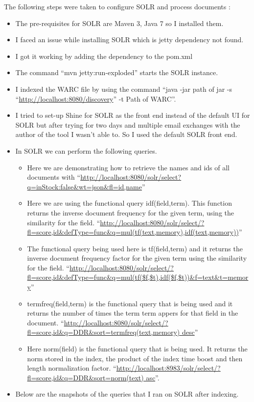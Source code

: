 The following steps were taken to configure SOLR and process documents :
\begin{itemize}
	\item The pre-requisites for SOLR are Maven 3, Java 7 so I installed them.
	\item I faced an issue while installing SOLR which is jetty dependency not found.
	\item I got it working by adding the dependency to the pom.xml
	\item The command ``mvn jetty:run-exploded'' starts the SOLR instance.
	\item I indexed the WARC file by using the command ``java -jar path of jar -s ``\url{http://localhost:8080/discovery}'' -t Path of WARC''.
	\item I tried to set-up Shine for SOLR as the front end instead of the default UI for SOLR but after trying for two days and multiple email exchanges with the author of the tool I wasn't able to. So I used the default SOLR front end.
	\item In SOLR we can perform the following queries.
	\begin{itemize}
	\item Here we are demonstrating how to retrieve the names and ids of all documents with ``\url{http://localhost:8080/solr/select?q=inStock:false&wt=json&fl=id,name}''
	\item Here we are using the functional query idf(field,term). This function returns the inverse document frequency for the given term, using the similarity for the field. ``\url{http://localhost:8080/solr/select/?fl=score,id&defType=func&q=mul(tf(text,memory),idf(text,memory))}''
	
	\item The functional query being used here is tf(field,term) and it returns the inverse document frequency factor for the given term using the similarity for the field. ``\url{http://localhost:8080/solr/select/?fl=score,id&defType=func&q=mul(tf($f,$t),idf($f,$t))&f=text&t=memory}''
	
	\item termfreq(field,term) is the functional query that is being used and it returns the number of times the term term appers for that field in the document. ``\url{http://localhost:8080/solr/select/?fl=score,id&q=DDR&sort=termfreq(text,memory) desc}''  
	
	\item Here norm(field) is the functional query that is being used. It returns the norm stored in the index, the product of the index time boost and then length normalization factor. ``\url{http://localhost:8983/solr/select/?fl=score,id&q=DDR&sort=norm(text) asc}''.
	\end{itemize}
	
	\item Below are the snapshots of the queries that I ran on SOLR after indexing.
\end{itemize}
